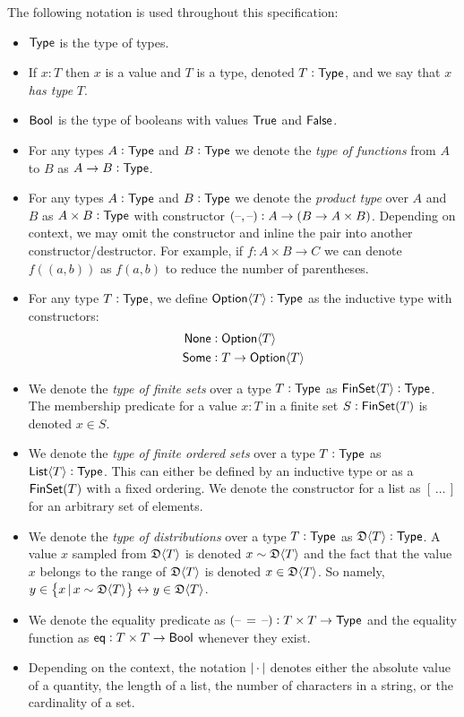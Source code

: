 
The following notation is used throughout this specification:

\begin{itemize}
    \item ${\textsf{Type}}$ is the type of types\footnotemark{}.
    \item If $x : T$ then $x$ is a value and $T$ is a type, denoted $T : {\textsf{Type}}$, and we say that $x$ \emph{has type} $T$.
    \item ${\textsf{Bool}}$ is the type of booleans with values ${\textsf{True}}$ and ${\textsf{False}}$.
    \item For any types $A : {\textsf{Type}}$ and $B : {\textsf{Type}}$ we denote the \emph{type of functions} from $A$ to $B$ as $A \to B : {\textsf{Type}}$.
    \item For any types $A : {\textsf{Type}}$ and $B : {\textsf{Type}}$ we denote the \emph{product type} over $A$ and $B$ as $A \times B : {\textsf{Type}}$ with constructor $({\textrm{--}}, {\textrm{--}}) : A \to (B \to A \times B)$. Depending on context, we may omit the constructor and inline the pair into another constructor/destructor. For example, if $f : A \times B \to C$ we can denote $f((a, b))$ as $f(a, b)$ to reduce the number of parentheses.
    \item For any type $T : {\textsf{Type}}$, we define ${\textsf{Option}}\langle{T}\rangle : {\textsf{Type}}$ as the inductive type with constructors:
        \begin{align*}
            {\textsf{None}} &: {\textsf{Option}}\langle{T}\rangle \\
            {\textsf{Some}} &: T \to {\textsf{Option}}\langle{T}\rangle
        \end{align*}
    \item We denote the \emph{type of finite sets} over a type $T : {\textsf{Type}}$ as ${\textsf{FinSet}}\langle{T}\rangle : {\textsf{Type}}$. The membership predicate for a value $x : T$ in a finite set $S : {\textsf{FinSet}}(T)$ is denoted $x \in S$.
    \item We denote the \emph{type of finite ordered sets} over a type $T : {\textsf{Type}}$ as ${\textsf{List}}\langle{T}\rangle : {\textsf{Type}}$. This can either be defined by an inductive type or as a ${\textsf{FinSet}}(T)$ with a fixed ordering. We denote the constructor for a list as $[\,\dots\,]$ for an arbitrary set of elements.
    \item We denote the \emph{type of distributions} over a type $T : {\textsf{Type}}$ as $\mathfrak{D}\langle{T}\rangle : {\textsf{Type}}$. A value $x$ sampled from $\mathfrak{D}\langle{T}\rangle$ is denoted $x \sim \mathfrak{D}\langle{T}\rangle$ and the fact that the value $x$ belongs to the range of $\mathfrak{D}\langle{T}\rangle$ is denoted $x \in \mathfrak{D}\langle{T}\rangle$. So namely, $y \in \set{x \,|\, x \sim \mathfrak{D}\langle{T}\rangle} \leftrightarrow y \in \mathfrak{D}\langle{T}\rangle$.
    \item We denote the equality predicate as $({\textrm{--}}\,=\,{\textrm{--}}) : T \times T \to {\textsf{Type}}$ and the equality function as ${\textsf{eq}} : T \times T \to {\textsf{Bool}}$ whenever they exist.
    \item Depending on the context, the notation $\left|\,\cdot\,\right|$ denotes either the absolute value of a quantity, the length of a list, the number of characters in a string, or the cardinality of a set.
\end{itemize}

